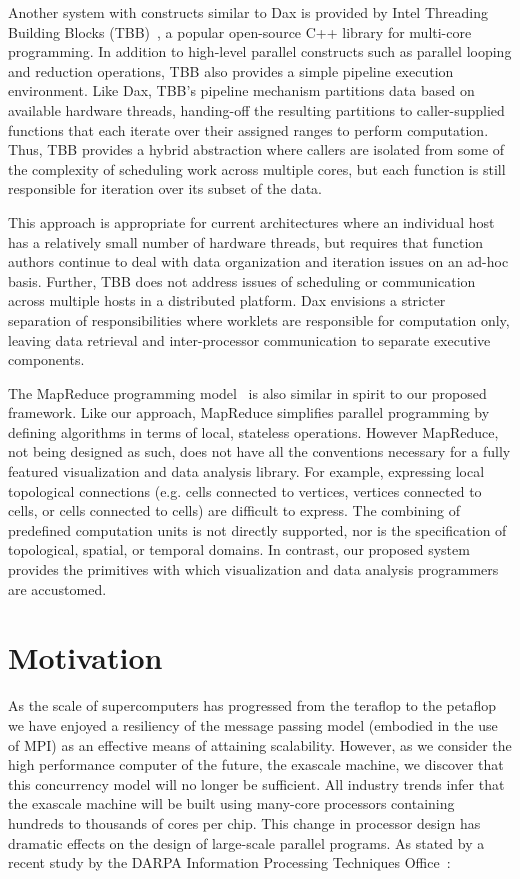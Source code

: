 \documentclass{vgtc}                          %
\newcommand*{\lcite}[1]{~\cite{#1}}
\begin{document}
Another system with constructs similar to Dax
is provided by Intel Threading Building Blocks (TBB)\lcite{TBB}, a
popular open-source C++ library for multi-core programming.  In addition to
high-level parallel constructs such as parallel looping and reduction
operations, TBB also provides a simple pipeline execution environment.
Like Dax, TBB's pipeline mechanism
partitions data based on available hardware threads, handing-off the
resulting partitions to caller-supplied functions that each iterate over
their assigned ranges to perform computation.  Thus, TBB provides a hybrid
abstraction where callers are isolated from some of the complexity of
scheduling work across multiple cores, but each function is still
responsible for iteration over its subset of the data.

This approach is appropriate for current architectures where an individual
host has a relatively small number of hardware threads, but requires that
function authors continue to deal with data organization and iteration
issues on an ad-hoc basis.  Further, TBB does not address issues of
scheduling or communication across multiple hosts in a distributed
platform.  Dax envisions a stricter separation of
responsibilities where worklets are responsible for computation only,
leaving data retrieval and inter-processor communication to separate
executive components.

The MapReduce programming model\lcite{MapReduce} is also similar in spirit
to our proposed framework.  Like our approach, MapReduce simplifies
parallel programming by defining algorithms in terms of local, stateless
operations.  However MapReduce, not being designed as such, does not have
all the conventions necessary for a fully featured visualization and data
analysis library.  For example, expressing local topological connections
(e.g. cells connected to vertices, vertices connected to cells, or cells
connected to cells) are difficult to express.  The combining of predefined
computation units is not directly supported, nor is the specification of
topological, spatial, or temporal domains.  In contrast, our proposed
system provides the primitives with which visualization and data analysis
programmers are accustomed.

\section{Motivation}
\label{sec:Motivation}


As the scale of supercomputers has progressed from the teraflop to the
petaflop we have enjoyed a resiliency of the message passing model
(embodied in the use of MPI) as an effective means of attaining
scalability.  However, as we consider the high performance computer of the
future, the exascale machine, we discover that this concurrency model will
no longer be sufficient.  All industry trends infer that the exascale
machine will be built using many-core processors containing hundreds to
thousands of cores per chip.  This change in processor design has dramatic
effects on the design of large-scale parallel programs.  As stated by a
recent study by the DARPA Information Processing Techniques
Office\lcite{DARPAExascaleStudy}:
\end{document}
